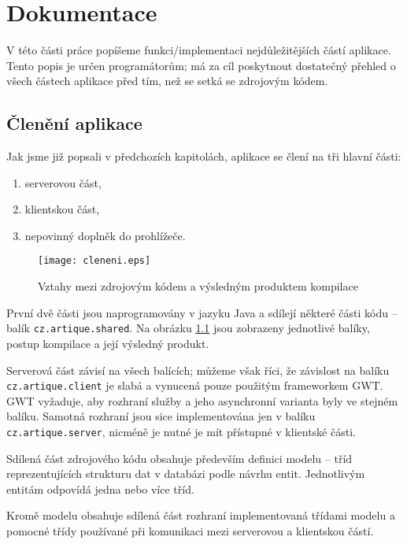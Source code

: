 \chapter{Dokumentace}

V této části práce popíšeme funkci/implementaci nejdůležitějších částí aplikace.
Tento popis je určen programátorům; má za cíl poskytnout dostatečný přehled o všech částech aplikace před tím, než se setká se zdrojovým kódem.

\section{Členění aplikace}

Jak jsme již popsali v předchozích kapitolách, aplikace se člení na tři hlavní části:
\begin{enumerate}
	\item serverovou část,
	\item klientskou část,
	\item nepovinný doplněk do prohlížeče.
\end{enumerate}

\begin{figure}
    \centering
    \texttt{[image: cleneni.eps]}
    \caption{Vztahy mezi zdrojovým kódem a výsledným produktem kompilace}
    \label{fig:cleneni}
\end{figure}

První dvě části jsou naprogramovány v jazyku Java a sdílejí některé části kódu -- balík \verb|cz.artique.shared|.
Na obrázku \ref{fig:cleneni} jsou zobrazeny jednotlivé balíky, postup kompilace a její výsledný produkt.

Serverová část závisí na všech balících; můžeme však říci, že závislost na balíku \verb|cz.artique.client| je slabá a vynucená pouze použitým frameworkem GWT.
GWT vyžaduje, aby rozhraní služby a jeho asynchronní varianta byly ve stejném balíku.
Samotná rozhraní jsou sice implementována jen v balíku \verb|cz.artique.server|, nicméně je nutné je mít přístupné v klientské části.

Sdílená část zdrojového kódu obsahuje především definici modelu -- tříd reprezentujících strukturu dat v databázi podle návrhu entit.
Jednotlivým entitám odpovídá jedna nebo více tříd.

Kromě modelu obsahuje sdílená část rozhraní implementovaná třídami modelu a pomocné třídy používané při komunikaci mezi serverovou a klientskou částí.

\bigskip


